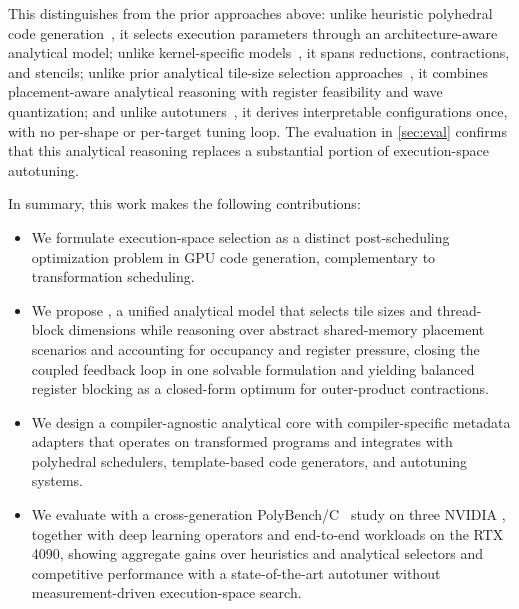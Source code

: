 This distinguishes \name from the prior approaches above: unlike heuristic polyhedral code generation~\cite{ppcg}, it selects execution parameters through an architecture-aware analytical model; unlike kernel-specific \gpu models~\cite{li-gemm,saday-conv,blis}, it spans reductions, contractions, and stencils; unlike prior analytical tile-size selection approaches~\cite{ppcg-tss,eatss,pluto-tss}, it combines placement-aware analytical reasoning with register feasibility and wave quantization; and unlike autotuners~\cite{ansor,metaschedule}, it derives interpretable configurations once, with no per-shape or per-target tuning loop. The evaluation in \autoref{sec:eval} confirms that this analytical reasoning replaces a substantial portion of \gpu execution-space autotuning.

In summary, this work makes the following contributions:
\begin{itemize}
  \item We formulate \gpu execution-space selection as a distinct post-scheduling optimization problem in GPU code generation, complementary to transformation scheduling.
  \item We propose \name, a unified analytical model that selects tile sizes and thread-block dimensions while reasoning over abstract shared-memory placement scenarios and accounting for occupancy and register pressure, closing the coupled feedback loop in one solvable formulation and yielding balanced register blocking as a closed-form optimum for outer-product contractions.
  \item We design a compiler-agnostic analytical core with compiler-specific metadata adapters that operates on transformed programs and integrates with polyhedral schedulers, template-based code generators, and autotuning systems.
  \item We evaluate \name with a cross-generation PolyBench/C~\cite{polybench} study on three NVIDIA \gpus, together with deep learning operators and end-to-end workloads on the RTX 4090, showing aggregate gains over heuristics and analytical selectors and competitive performance with a state-of-the-art autotuner without measurement-driven execution-space search.
\end{itemize}
